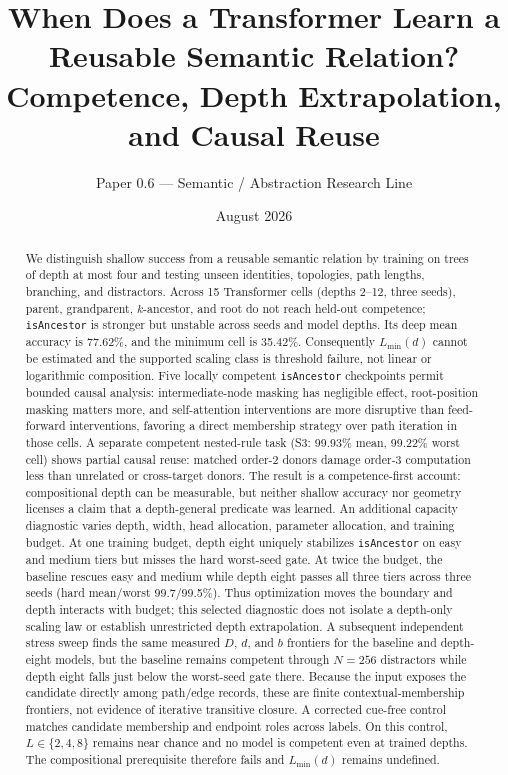 \documentclass[10pt]{article}
\title{When Does a Transformer Learn a Reusable Semantic Relation?\\Competence, Depth Extrapolation, and Causal Reuse}
\author{Paper 0.6 --- Semantic / Abstraction Research Line}\date{August 2026}
\begin{document}
\maketitle
\begin{abstract}
We distinguish shallow success from a reusable semantic relation by training on trees of depth at most four and testing unseen identities, topologies, path lengths, branching, and distractors. Across 15 Transformer cells (depths 2--12, three seeds), parent, grandparent, $k$-ancestor, and root do not reach held-out competence; \texttt{isAncestor} is stronger but unstable across seeds and model depths. Its deep mean accuracy is 77.62\%, and the minimum cell is 35.42\%. Consequently $L_{\min}(d)$ cannot be estimated and the supported scaling class is threshold failure, not linear or logarithmic composition. Five locally competent \texttt{isAncestor} checkpoints permit bounded causal analysis: intermediate-node masking has negligible effect, root-position masking matters more, and self-attention interventions are more disruptive than feed-forward interventions, favoring a direct membership strategy over path iteration in those cells. A separate competent nested-rule task (S3: 99.93\% mean, 99.22\% worst cell) shows partial causal reuse: matched order-2 donors damage order-3 computation less than unrelated or cross-target donors. The result is a competence-first account: compositional depth can be measurable, but neither shallow accuracy nor geometry licenses a claim that a depth-general predicate was learned.
An additional capacity diagnostic varies depth, width, head allocation, parameter allocation, and training budget. At one training budget, depth eight uniquely stabilizes \texttt{isAncestor} on easy and medium tiers but misses the hard worst-seed gate. At twice the budget, the baseline rescues easy and medium while depth eight passes all three tiers across three seeds (hard mean/worst 99.7/99.5\%). Thus optimization moves the boundary and depth interacts with budget; this selected diagnostic does not isolate a depth-only scaling law or establish unrestricted depth extrapolation.
A subsequent independent stress sweep finds the same measured $D$, $d$, and $b$ frontiers for the baseline and depth-eight models, but the baseline remains competent through $N=256$ distractors while depth eight falls just below the worst-seed gate there. Because the input exposes the candidate directly among path/edge records, these are finite contextual-membership frontiers, not evidence of iterative transitive closure. A corrected cue-free control matches candidate membership and endpoint roles across labels. On this control, $L\in\{2,4,8\}$ remains near chance and no model is competent even at trained depths. The compositional prerequisite therefore fails and $L_{\min}(d)$ remains undefined.
\end{abstract}
\end{document}

